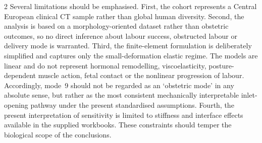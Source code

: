 \documentclass[openacc]{rsproca_new}
\begin{document}
\begin{multicols}{2}
Several limitations should be emphasised. First, the cohort represents a Central European clinical CT sample rather than global human diversity. Second, the analysis is based on a morphology-oriented dataset rather than obstetric outcomes, so no direct inference about labour success, obstructed labour or delivery mode is warranted. Third, the finite-element formulation is deliberately simplified and captures only the small-deformation elastic regime. The models are linear and do not represent hormonal remodelling, viscoelasticity, posture-dependent muscle action, fetal contact or the nonlinear progression of labour. Accordingly, mode~9 should not be regarded as an `obstetric mode' in any absolute sense, but rather as the most consistent mechanically interpretable inlet-opening pathway under the present standardised assumptions. Fourth, the present interpretation of sensitivity is limited to stiffness and interface effects available in the supplied workbooks. These constraints should temper the biological scope of the conclusions.




\end{multicols}
\end{document}
